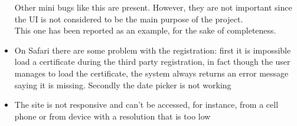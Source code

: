 \begin{itemize}
Other mini bugs like this are present. However, they are not important since the 
UI is not considered to be the main purpose of the project. \\
This one has been reported as an example, for the sake of completeness.

\item 
On Safari there are some problem with the registration: first it is impossible load a
certificate during the third party registration, in fact though the user manages to load the
certificate, the system always returns an error message saying it is missing. Secondly the
date picker is not working 

\item 
The site is not responsive and can't be accessed, for instance, from a cell phone or from device with a resolution that is too low

\end{itemize}